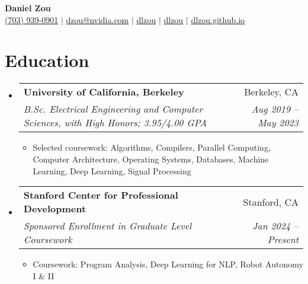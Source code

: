 \documentclass[letterpaper,11pt]{article}
\makeatletter
\newcommand{\resumeItem}[1]{
  \item\small{
    {#1 \vspace{-2pt}}
  }
}
\newcommand{\resumeSubheading}[4]{
  \vspace{-2pt}\item
    \begin{tabular*}{0.97\textwidth}[t]{l@{\extracolsep{\fill}}r}
      \textbf{#1} & #2 \\
      \textit{\small#3} & \textit{\small #4} \\
    \end{tabular*}\vspace{-7pt}
}
\newcommand{\resumeSubHeadingListStart}{\begin{itemize}[leftmargin=0.15in, label={}]}
\newcommand{\resumeSubHeadingListEnd}{\end{itemize}}
\newcommand{\resumeItemListStart}{\begin{itemize}}
\newcommand{\resumeItemListEnd}{\end{itemize}\vspace{-5pt}}
\makeatother
\begin{document}

\begin{center}
    \textbf{\Huge Daniel Zou} \\ \vspace{3pt}
    \small
    \faMobile \hspace{.5pt} \href{tel:17039390901}{(703) 939-0901}
    $|$
    \faEnvelope \hspace{.5pt} \href{mailto:dzou@nvidia.com}{dzou@nvidia.com}
    $|$
    \faLinkedinSquare \hspace{.5pt} \href{https://www.linkedin.com/in/dlzou}{dlzou}
    $|$
    \faGithub \hspace{.5pt} \href{https://github.com/dlzou}{dlzou}
    $|$
    \faGlobe \hspace{.5pt} \href{https://dlzou.github.io}{dlzou.github.io}
\end{center}




\section{Education}
  \vspace{3pt}
  \resumeSubHeadingListStart
    
    \resumeSubheading
      {University of California, Berkeley}{Berkeley, CA}
      {B.Sc. Electrical Engineering and Computer Sciences, with High Honors; 3.95/4.00 GPA}{Aug 2019 -- May 2023}
        \resumeItemListStart
          \resumeItem{Selected coursework: Algorithms, Compilers, Parallel Computing, Computer Architecture, Operating Systems, Databases, Machine Learning, Deep Learning, Signal Processing}
        \resumeItemListEnd

    \resumeSubheading
      {Stanford Center for Professional Development}{Stanford, CA}
      {Sponsored Enrollment in Graduate Level Coursework}{Jan 2024 -- Present}
        \resumeItemListStart
          \resumeItem{Coursework: Program Analysis, Deep Learning for NLP, Robot Autonomy I \& II}
        \resumeItemListEnd

    
  \resumeSubHeadingListEnd



\end{document}
